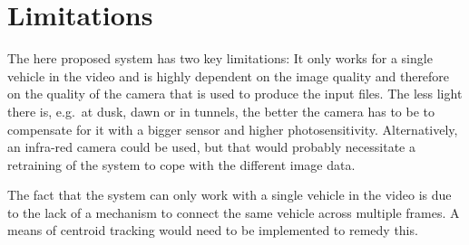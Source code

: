 \section{Limitations}

The here proposed system has two key limitations: It only works for a single vehicle in the video and is highly dependent on the image quality and therefore on the quality of the camera that is used to produce the input files.
The less light there is, e.g.\ at dusk, dawn or in tunnels, the better the camera has to be to compensate for it with a bigger sensor and higher photosensitivity.
Alternatively, an infra-red camera could be used, but that would probably necessitate a retraining of the system to cope with the different image data.

The fact that the system can only work with a single vehicle in the video is due to the lack of a mechanism to connect the same vehicle across multiple frames.
A means of centroid tracking would need to be implemented to remedy this.
